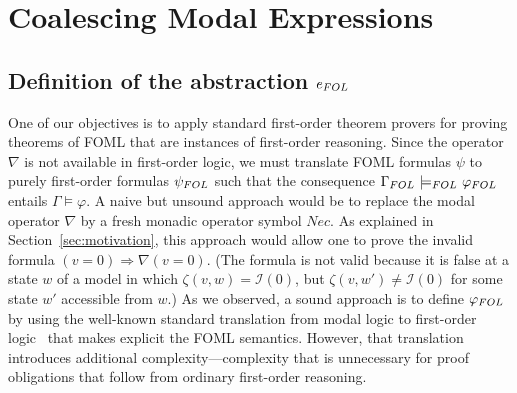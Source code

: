 \documentclass{easychair}
\renewcommand{\implies}{\Rightarrow}
\newcommand{\FOL}[1]{\ensuremath{#1_{\textit{\scriptsize FOL}}}}
\newcommand{\folmodels}{\mathop{\models_{\textit{\scriptsize FOL}}}}
\newcommand{\modal}{\nabla}
\newcommand{\II}{\mathcal{I}}
\newcommand{\edmargin}[2]{\marginpar{\raggedright\footnotesize\color{red}#1: #2}}
\newcommand{\edmargin}[2]{}
\def\llmargin{\edmargin{LL}}
\def\smmargin{\edmargin{SM}}
\def\ddmargin{\edmargin{DD}}
\newcommand{\TRUE}{\mbox{\sc true}}
\begin{document}
\section{Coalescing Modal Expressions}
\label{sec:coalescing-modal}

\subsection{Definition of the abstraction $\FOL{e}$}

One of our objectives is to apply standard first-order theorem provers
for proving theorems of FOML that are instances of first-order
reasoning.  Since the operator~$\modal$ is not available in first-order
logic, we must translate FOML formulas $\psi$ to purely
first-order formulas $\FOL{\psi}$ such that the consequence
$\FOL{\Gamma} \,\folmodels\, \FOL{\varphi}$ entails $\Gamma \models
\varphi$.  A naive but unsound approach would be to replace the modal
operator $\modal$ by a fresh monadic operator symbol $Nec$.
As explained in Section~\ref{sec:motivation}, this approach
would allow one to prove the invalid
formula %
$(v=0) \implies \modal(v=0)$.
(The formula is not valid because it is false at a state $w$ of a model
in which $\zeta(v,w) = \II(0)$, but $\zeta(v,w') \neq \II(0)$
for some state $w'$ accessible from $w$.)
%
%
%
As we observed, a sound approach is to define $\FOL{\varphi}$ by using
the well-known standard translation from modal logic to first-order
logic~\cite{brauner:foml,ohlbach:translation} that makes explicit the
FOML semantics.  However, that translation introduces additional
complexity---complexity that is unnecessary for proof obligations that
follow from ordinary first-order reasoning.
\end{document}
